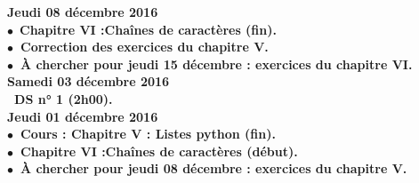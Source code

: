 \documentclass[12pt,a4paper]{article}
\begin{document}
%  
%  
%  
%  
%  
%  

%  


\noindent\textbf{\bf Jeudi 08 décembre 2016 \rm}\\
$\bullet$\ \bf Chapitre VI :\rm Chaînes de caractères (fin).\\
$\bullet$\ Correction des exercices du chapitre V.\\
$\bullet$\ À chercher pour jeudi 15 décembre : exercices du chapitre VI.
\vspace{.4cm}\\
  
\noindent\textbf{\bf Samedi 03 décembre 2016 \rm}\\
\bu\ DS n° 1 (2h00).\vspace{.4cm}\\

\noindent\textbf{\bf Jeudi 01 décembre 2016 \rm}\\
$\bullet$\ Cours : \bf Chapitre V \rm : Listes python (fin).\\
$\bullet$\ \bf Chapitre VI :\rm Chaînes de caractères (début).\\
$\bullet$\ À chercher pour jeudi 08 décembre : exercices du chapitre V.\vspace{.4cm}\\
\end{document}
